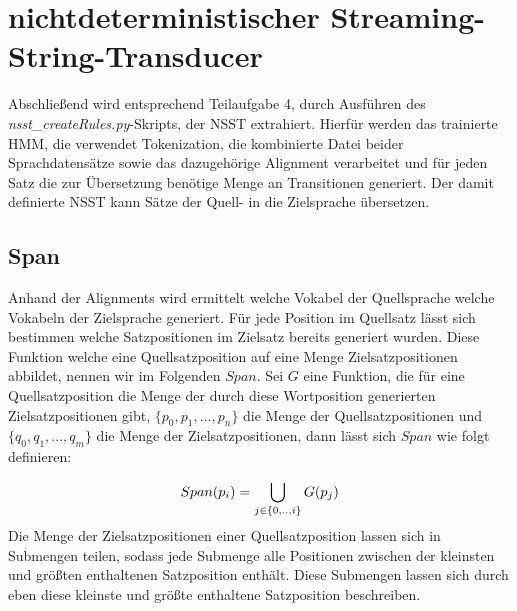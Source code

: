 \documentclass[conference]{IEEEtran}
\begin{document}
\section{nichtdeterministischer Streaming-String-Transducer}
Abschließend wird entsprechend Teilaufgabe 4, durch Ausführen des \textit{nsst\_createRules.py}-Skripts, der NSST extrahiert.
Hierfür werden das trainierte HMM, die verwendet Tokenization, die kombinierte Datei beider Sprachdatensätze sowie das dazugehörige Alignment verarbeitet und für jeden Satz die zur Übersetzung benötige Menge an Transitionen generiert.
Der damit definierte NSST kann Sätze der Quell- in die Zielsprache übersetzen.

\subsection{Span}
Anhand der Alignments wird ermittelt welche Vokabel der Quellsprache welche 
Vokabeln der Zielsprache generiert. 
Für jede Position im Quellsatz lässt sich bestimmen welche Satzpositionen im Zielsatz bereits generiert wurden. 
Diese Funktion welche eine Quellsatzposition auf eine Menge Zielsatzpositionen abbildet, nennen wir im Folgenden $Span$.
Sei $G$ eine Funktion, die für eine Quellsatzposition die Menge der durch diese Wortposition generierten Zielsatzpositionen gibt, $\{p_0, p_1,..., p_n\}$ die Menge der Quellsatzpositionen und $\{q_0, q_1,..., q_m\}$ die Menge der Zielsatzpositionen, dann lässt sich  $Span$ wie folgt definieren:

\begin{equation}\notag
    \begin{aligned}
        Span(p_i) &=\bigcup\limits_{j  \in \{0, .. , i\}} G(p_j)\\
    \end{aligned}
\end{equation}
Die Menge der Zielsatzpositionen einer Quellsatzposition lassen sich in Submengen teilen, sodass jede Submenge alle Positionen zwischen der kleinsten und größten enthaltenen Satzposition enthält. Diese Submengen lassen sich durch eben diese kleinste und größte enthaltene Satzposition beschreiben.
\end{document}
